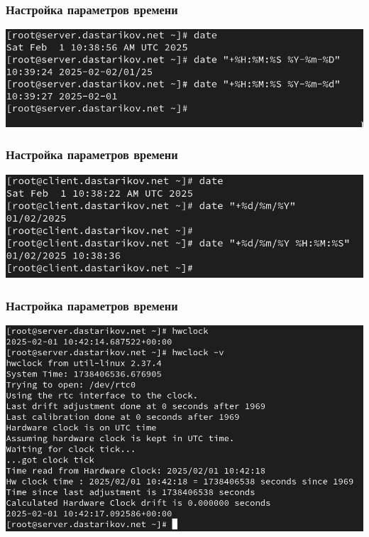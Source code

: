 \begin{frame}
  \frametitle{Настройка параметров времени}
  \centering
  \includegraphics[width=\textwidth]{../images/image04.png}
\end{frame}

\begin{frame}
  \frametitle{Настройка параметров времени}
  \centering
  \includegraphics[width=\textwidth]{../images/image03.png}
\end{frame}

\begin{frame}
  \frametitle{Настройка параметров времени}
  \centering
  \includegraphics[width=\textwidth]{../images/image07.png}
\end{frame}

